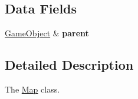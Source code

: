 \subsection*{\-Data \-Fields}
\begin{DoxyCompactItemize}
\item 
\hypertarget{class_map_a92ac4c5c1217021ff1adc545a29f1294}{\hyperlink{class_game_object}{\-Game\-Object} \& {\bfseries parent}}\label{class_map_a92ac4c5c1217021ff1adc545a29f1294}

\end{DoxyCompactItemize}


\subsection{\-Detailed \-Description}
\-The \hyperlink{class_map}{\-Map} class. 

